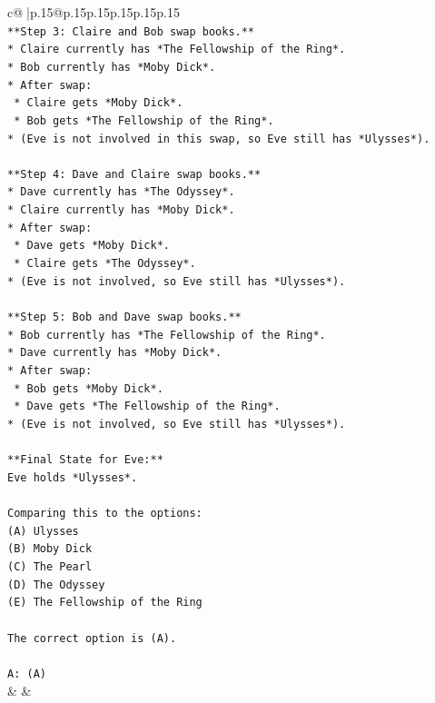 \documentclass{article}
\begin{document}
{\begin{supertabular}{c@{$\;$}|p{.15\linewidth}@{}p{.15\linewidth}p{.15\linewidth}p{.15\linewidth}p{.15\linewidth}p{.15\linewidth}}
{{{\\ 
\texttt{**Step 3: Claire and Bob swap books.**} \\
\texttt{*   Claire currently has *The Fellowship of the Ring*.} \\
\texttt{*   Bob currently has *Moby Dick*.} \\
\texttt{*   After swap:} \\
\texttt{    *   Claire gets *Moby Dick*.} \\
\texttt{    *   Bob gets *The Fellowship of the Ring*.} \\
\texttt{*   (Eve is not involved in this swap, so Eve still has *Ulysses*).} \\
\\ 
\texttt{**Step 4: Dave and Claire swap books.**} \\
\texttt{*   Dave currently has *The Odyssey*.} \\
\texttt{*   Claire currently has *Moby Dick*.} \\
\texttt{*   After swap:} \\
\texttt{    *   Dave gets *Moby Dick*.} \\
\texttt{    *   Claire gets *The Odyssey*.} \\
\texttt{*   (Eve is not involved, so Eve still has *Ulysses*).} \\
\\ 
\texttt{**Step 5: Bob and Dave swap books.**} \\
\texttt{*   Bob currently has *The Fellowship of the Ring*.} \\
\texttt{*   Dave currently has *Moby Dick*.} \\
\texttt{*   After swap:} \\
\texttt{    *   Bob gets *Moby Dick*.} \\
\texttt{    *   Dave gets *The Fellowship of the Ring*.} \\
\texttt{*   (Eve is not involved, so Eve still has *Ulysses*).} \\
\\ 
\texttt{**Final State for Eve:**} \\
\texttt{Eve holds *Ulysses*.} \\
\\ 
\texttt{Comparing this to the options:} \\
\texttt{(A) Ulysses} \\
\texttt{(B) Moby Dick} \\
\texttt{(C) The Pearl} \\
\texttt{(D) The Odyssey} \\
\texttt{(E) The Fellowship of the Ring} \\
\\ 
\texttt{The correct option is (A).} \\
\\ 
\texttt{A: (A)} \\
            }
        }
    }
    & & \\ \\


\end{supertabular}}
\end{document}
